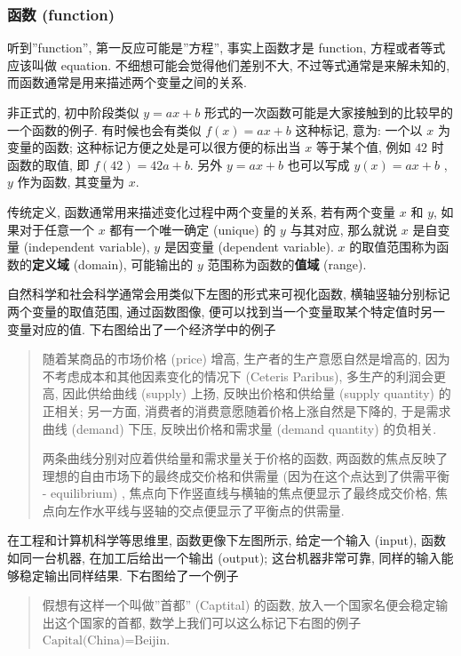 \hypertarget{ux51fdux6570-function}{%
\subsubsection{函数 (function)}\label{ux51fdux6570-function}}

听到''function'', 第一反应可能是''方程'', 事实上函数才是 function,
方程或者等式应该叫做 equation. 不细想可能会觉得他们差别不大,
不过等式通常是来解未知的, 而函数通常是用来描述两个变量之间的关系.

非正式的, 初中阶段类似 \(y=ax+b\)
形式的一次函数可能是大家接触到的比较早的一个函数的例子. 有时候也会有类似
\(f(x)=ax+b\) 这种标记, 意为: 一个以 \(x\) 为变量的函数;
这种标记方便之处是可以很方便的标出当 \(x\) 等于某个值, 例如 \(42\)
时函数的取值, 即 \(f(42)=42a+b\). 另外 \(y=ax+b\) 也可以写成
\(y(x)=ax+b\) , \(y\) 作为函数, 其变量为 \(x\).

传统定义, 函数通常用来描述变化过程中两个变量的关系, 若有两个变量 \(x\)
和 \(y\), 如果对于任意一个 \(x\) 都有一个唯一确定 (unique) 的 \(y\)
与其对应, 那么就说 \(x\) 是自变量 (independent variable), \(y\) 是因变量
(dependent variable). \(x\) 的取值范围称为函数的\textbf{定义域}
(domain), 可能输出的 \(y\) 范围称为函数的\textbf{值域} (range).

自然科学和社会科学通常会用类似下左图的形式来可视化函数,
横轴竖轴分别标记两个变量的取值范围, 通过函数图像,
便可以找到当一个变量取某个特定值时另一变量对应的值.
下右图给出了一个经济学中的例子

\begin{quote}
随着某商品的市场价格 (price) 增高, 生产者的生产意愿自然是增高的,
因为不考虑成本和其他因素变化的情况下 (Ceteris Paribus),
多生产的利润会更高, 因此供给曲线 (supply) 上扬, 反映出价格和供给量
(supply quantity) 的正相关; 另一方面,
消费者的消费意愿随着价格上涨自然是下降的, 于是需求曲线 (demand) 下压,
反映出价格和需求量 (demand quantity) 的负相关.

两条曲线分别对应着供给量和需求量关于价格的函数,
两函数的焦点反映了理想的自由市场下的最终成交价格和供需量
(因为在这个点达到了供需平衡 - equilibrium) ,
焦点向下作竖直线与横轴的焦点便显示了最终成交价格,
焦点向左作水平线与竖轴的交点便显示了平衡点的供需量.
\end{quote}

在工程和计算机科学等思维里, 函数更像下左图所示, 给定一个输入 (input),
函数如同一台机器, 在加工后给出一个输出 (output); 这台机器非常可靠,
同样的输入能够稳定输出同样结果. 下右图给了一个例子

\begin{quote}
假想有这样一个叫做''首都'' (Captital) 的函数,
放入一个国家名便会稳定输出这个国家的首都,
数学上我们可以这么标记下右图的例子 \(\text{Capital(China)=Beijin}\).
\end{quote}

